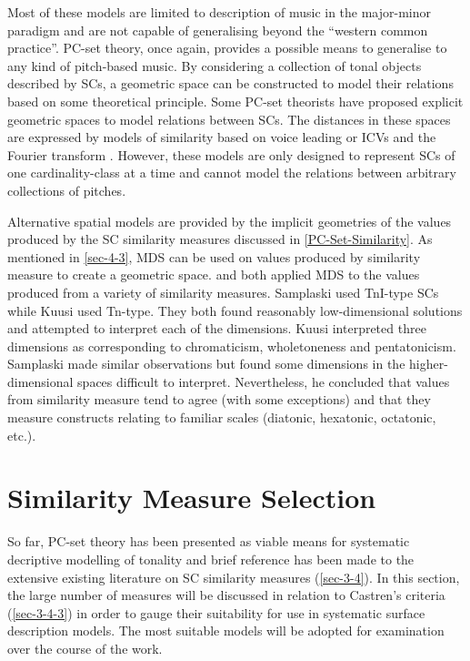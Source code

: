 \documentclass{article}
\begin{document}
Most of these models are limited to description of music in the
major-minor paradigm and are not capable of generalising beyond the
``western common practice''. PC-set theory, once again, provides a
possible means to generalise to any kind of pitch-based music. By
considering a collection of tonal objects described by SCs, a
geometric space can be constructed to model their relations based on
some theoretical principle. Some PC-set theorists have proposed
explicit geometric spaces to model relations between SCs. The
distances in these spaces are expressed by models of similarity based
on voice leading \citep{Cohn2003,Tymoczko2012} or ICVs and the Fourier
transform \citep{Quinn2006, Quinn2007}. However, these models are only
designed to represent SCs of one cardinality-class at a time and
cannot model the relations between arbitrary collections of pitches.

Alternative spatial models are provided by the implicit geometries of
the values produced by the SC similarity measures discussed in \ref{PC-Set-Similarity}. As mentioned in \ref{sec-4-3}, MDS can be
used on values produced by similarity measure to create a geometric
space. \citet{Kuusi2001} and \citet{Samplaski2005a} both applied MDS to
the values produced from a variety of similarity measures. Samplaski
used TnI-type SCs while Kuusi used Tn-type. They both found reasonably
low-dimensional solutions and attempted to interpret each of the
dimensions. Kuusi interpreted three dimensions as corresponding to
chromaticism, wholetoneness and pentatonicism. Samplaski made similar
observations but found some dimensions in the higher-dimensional
spaces difficult to interpret. Nevertheless, he concluded that values
from similarity measure tend to agree (with some exceptions) and that
they measure constructs relating to familiar scales (diatonic,
hexatonic, octatonic, etc.).
\section{Similarity Measure Selection}
\label{sec-6}

So far, PC-set theory has been presented as viable means for
systematic decriptive modelling of tonality and brief reference has
been made to the extensive existing literature on SC similarity
measures (\ref{sec-3-4}). In this section, the large number of
measures will be discussed in relation to Castren's criteria
(\ref{sec-3-4-3}) in order to gauge their suitability for use in
systematic surface description models. The most suitable models will
be adopted for examination over the course of the work.
\end{document}
